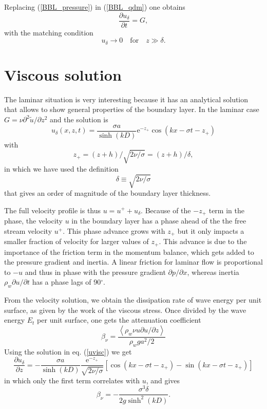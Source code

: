 Replacing (\ref{BBL_pressure}) in (\ref{BBL_qdm}) one obtains
\begin{equation}
\frac{\partial u_\delta}{\partial t}=  G,
\end{equation}
with the matching condition  
\begin{equation} 
u_\delta \rightarrow 
0 \quad \mathrm{for} \quad z \gg \delta.
\end{equation}


\section{Viscous solution}\label{wbbl_viscous}
The laminar situation is very interesting because it has an analytical solution 
that allows to show general properties of the boundary layer. 
In the laminar case $G=\nu {\partial^2 \widetilde{u}}/{\partial z^2}$  and the solution is
\begin{equation}
u_\delta (x,z,t)=\frac{\sigma a}{\sinh(kD)} \mathrm{e}^{-z_+} \cos\left(k x - \sigma t
-z_+\right)  \label{uvisc}
\end{equation}
with 
\begin{equation}
z_+=(z+h)/\sqrt{2 \nu/\sigma}=(z+h)/\delta,
\end{equation}
in which we have used the definition 
\begin{equation}
 \delta\equiv \sqrt{2 \nu/\sigma}
\end{equation}
that gives an order of magnitude of the boundary layer thickness. 


The full velocity profile is thus  $u=u^+ + u_\delta$.
Because of the $-z_+$  term in the phase, the velocity $u$ in the boundary layer has a phase ahead of the the free stream velocity $u^+$.
This phase advance grows with $z_+$ but it only impacts a smaller fraction of velocity for larger values of $z_+$.  This advance is due to the 
importance of the friction term in the momentum balance, which gets added to the pressure gradient and inertia. 
A linear friction for laminar flow is proportional to  $- u$  and thus in phase with the pressure gradient $\partial p / \partial x$,  whereas inertia $\rho_w \partial u/\partial t$ has a phase lags of 90$^\circ$.

From the velocity solution, we obtain the dissipation rate of wave energy per unit surface, 
as given by the work of the viscous stress. Once divided by the wave energy $E_t$ per unit surface, one gets the attenuation coefficient 
\begin{equation}
\beta_{\nu} = \frac{\left<\rho_w \nu u \partial u/\partial z\right>}{\rho_w g a^2/2}
\end{equation}
Using the solution in eq. (\ref{uvisc}) we get 
\begin{equation}
\frac{\partial u_\delta}{\partial z}=- \frac{\sigma a}{\sinh(kD)}  \frac{\mathrm{e}^{-z_+} }{\sqrt{2 \nu / \sigma}} \left[\cos\left(k x - \sigma t
-z_+\right) - \sin\left(k x - \sigma t
-z_+\right)\right] 
\end{equation}
in which only the first term correlates with  $u$, and gives 
\begin{equation}
\beta_{\nu} =-\frac{\sigma^3 \delta}{2 g \sinh^2(kD)}.
\end{equation}

